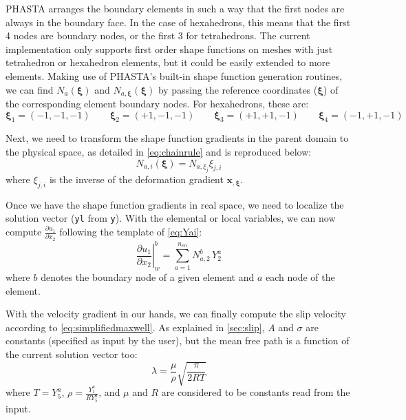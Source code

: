 \documentclass{ucb}
\begin{document}
PHASTA arranges the boundary elements in such a way that the first nodes are always in the boundary face. In the case of hexahedrons, this means that the first 4 nodes are boundary nodes, or the first 3 for tetrahedrons. The current implementation only supports first order shape functions on meshes with just tetrahedron or hexahedron elements, but it could be easily extended to more elements. Making use of PHASTA's built-in shape function generation routines, we can find $N_a(\bm{\xi})$ and $N_{a,\bm{\xi}}(\bm{\xi})$ by passing the reference coordinates ($\bm{\xi}$) of the corresponding element boundary nodes. For hexahedrons, these are:
\begin{equation}
    \bm{\xi}_1 = \left(-1, -1, -1\right) \qquad \bm{\xi}_2 = \left(+1, -1, -1\right) \qquad \bm{\xi}_3 = \left(+1, +1, -1\right) \qquad \bm{\xi}_4 = \left(-1, +1, -1\right)
\end{equation}

\pagebreak

Next, we need to transform the shape function gradients in the parent domain to the physical space, as detailed in \autoref{eq:chainrule} and is reproduced below:
\begin{equation}
    N_{a,i}(\bm{\xi}) = N_{a,\xi_j}\xi_{j,i}
\end{equation}
where $\xi_{j,i}$ is the inverse of the deformation gradient $\bm{x}_{,\bm{\xi}}$.

Once we have the shape function gradients in real space, we need to localize the solution vector (\texttt{yl} from \texttt{y}). With the elemental or local variables, we can now compute $\frac{\partial u_1}{\partial x_2}$ following the template of \autoref{eq:Yai}:
\begin{equation}
    \left.\frac{\partial u_1}{\partial x_2}\right|_w^b = \sum_{a = 1}^{n_{en}} N_{a,2}^b \, Y_2^a
\end{equation}
where $b$ denotes the boundary node of a given element and $a$ each node of the element.

With the velocity gradient in our hands, we can finally compute the slip velocity according to \eqref{eq:simplifiedmaxwell}. As explained in \autoref{sec:slip}, $A$ and $\sigma$ are constants (specified as input by the user), but the mean free path is a function of the current solution vector too:
\begin{equation}
    \lambda = \frac{\mu}{\rho}\sqrt{\frac{\pi}{2RT}}
\end{equation}
where $T = Y_5^a$, $\rho = \frac{Y_1^a}{R Y_5^a}$, and $\mu$ and $R$ are considered to be constants read from the input.
\end{document}
